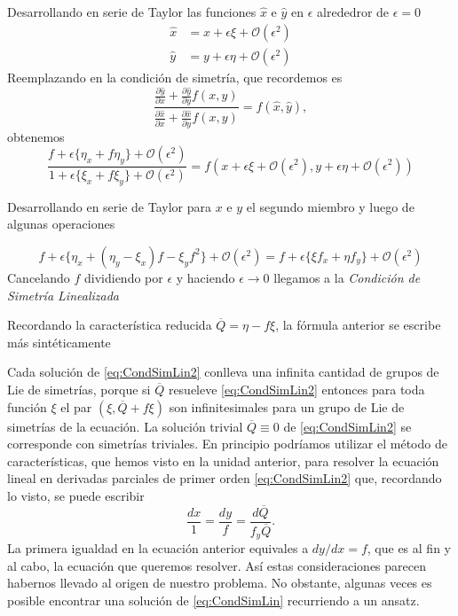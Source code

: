 Desarrollando en serie de Taylor las funciones $\hat{x}$ e $\hat{y}$ en $\epsilon$ alrededror de $\epsilon=0$
\[
 \begin{split}
  \hat{x}&=x+\epsilon\xi+\mathcal{O}(\epsilon^2)\\
  \hat{y}&=y+\epsilon\eta+\mathcal{O}(\epsilon^2)
  \end{split}
\]
Reemplazando en la condición de simetría, que recordemos es
\[\frac{\frac{\partial\hat{y}}{\partial x}+\frac{\partial\hat{y}}{\partial y}
 f(x,y)}{\frac{\partial\hat{x}}{\partial x}+\frac{\partial\hat{x}}{\partial y}f(x,y)}
 =f(\hat{x},\hat{y}),
\] 
obtenemos
\[\frac{f+\epsilon\{\eta_x+f\eta_y\}+\mathcal{O}(\epsilon^2)}
{1+\epsilon\{\xi_x+f\xi_y\}+\mathcal{O}(\epsilon^2)}
=f(x+\epsilon\xi+\mathcal{O}(\epsilon^2),y+\epsilon\eta+\mathcal{O}(\epsilon^2))
\]



Desarrollando en serie de Taylor para $x$ e $y$ el segundo miembro y luego de algunas operaciones

\[f+\epsilon\{\eta_x+(\eta_y-\xi_x)f-\xi_yf^2\}+\mathcal{O}(\epsilon^2)=
 f+\epsilon\{\xi f_x+\eta f_y\}+\mathcal{O}(\epsilon^2)
\]
Cancelando $f$ dividiendo por $\epsilon$ y haciendo $\epsilon\to 0$ llegamos a la 
\emph{Condición de Simetría Linealizada}


Recordando la característica reducida $\overline{Q}= \eta-f\xi$, la fórmula anterior se escribe más sintéticamente

Cada solución de \eqref{eq:CondSimLin2} conlleva una infinita cantidad de grupos de Lie de simetrías, porque si $\overline{Q}$ resueleve  \eqref{eq:CondSimLin2}  entonces para toda función $\xi$ el par $(\xi, \overline{Q}+f\xi)$ son infinitesimales para un grupo de Lie de simetrías de la ecuación. La solución trivial $\overline{Q}\equiv 0$ de  \eqref{eq:CondSimLin2}  se corresponde con simetrías triviales. En principio podríamos utilizar el método de características, que hemos visto en la unidad anterior, para resolver la ecuación lineal en derivadas parciales de primer orden \eqref{eq:CondSimLin2} que, recordando lo visto, se puede escribir
\[ \frac{dx}{1}=\frac{dy}{f}=\frac{d\overline{Q}}{f_y\overline{Q}}.\]
La primera igualdad en la ecuación anterior equivales a $dy/dx=f$, que es al fin y al cabo, la ecuación que queremos resolver. Así estas consideraciones parecen habernos llevado al origen de nuestro problema. No obstante, algunas veces es posible encontrar una solución de \eqref{eq:CondSimLin} recurriendo a un ansatz.

